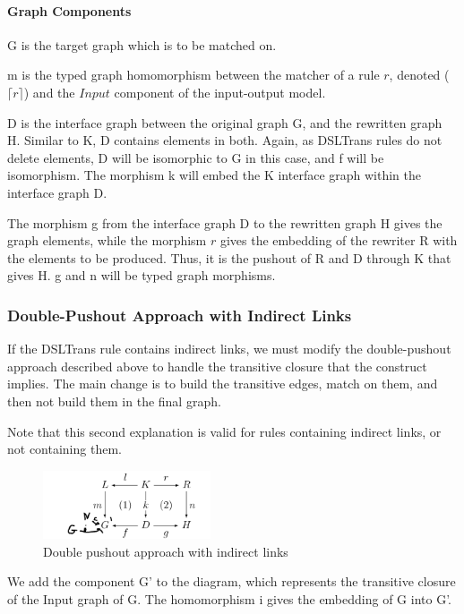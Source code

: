 \paragraph{Graph Components}

G is the target graph which is to be matched on.

m is the typed graph homomorphism between the matcher of a rule $r$, denoted ($\lceil r \rceil$) and the $\mathit{Input}$ component of the input-output model.

D is the interface graph between the original graph G, and the rewritten graph H. Similar to K, D contains elements in both. Again, as DSLTrans rules do not delete elements, D will be isomorphic to G in this case, and f will be isomorphism. The morphism k will embed the K interface graph within the interface graph D.

The morphism g from the interface graph D to the rewritten graph H gives the graph elements, while the morphism $r$ gives the embedding of the rewriter R with the elements to be produced. Thus, it is the pushout of R and D through K that gives H. g and n will be typed graph morphisms.


\subsubsection{Double-Pushout Approach with Indirect Links}

If the DSLTrans rule contains indirect links, we must modify the double-pushout approach described above to handle the transitive closure that the construct implies. The main change is to build the transitive edges, match on them, and then not build them in the final graph.

Note that this second explanation is valid for rules containing indirect links, or not containing them. 

\begin{figure}[h!] \centering
\includegraphics[width=0.44\textwidth]{figures/formal/dpo_with_NAC_and_indirect}
	\caption{Double pushout approach with indirect links}
	\label{fig:dpo_indirect}
\end{figure}

We add the component G' to the diagram, which represents the transitive closure of the Input graph of G. The homomorphism i gives the embedding of G into G'.

